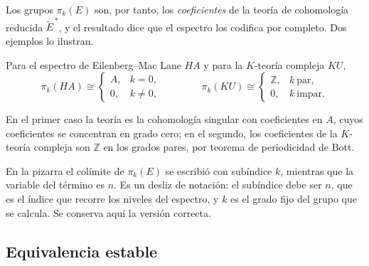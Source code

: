 Los grupos $\pi_k(E)$ son, por tanto, los \emph{coeficientes} de la teoría de cohomología reducida $\widetilde E^{\,*}$, y el resultado dice que el espectro los codifica por completo. Dos ejemplos lo ilustran.


\begin{ejem}\label{ejem:pi-ha-ku}
Para el espectro de Eilenberg--Mac Lane $HA$ y para la $K$-teoría compleja $KU$,
\[
\pi_k(HA)\cong
\begin{cases}
A, & k=0,\\
0, & k\neq0,
\end{cases}
\qquad\qquad
\pi_k(KU)\cong
\begin{cases}
\mathbb Z, & k\ \text{par},\\
0, & k\ \text{impar}.
\end{cases}
\]
\end{ejem}

En el primer caso la teoría es la cohomología singular con coeficientes en $A$, cuyos coeficientes se concentran en grado cero; en el segundo, los coeficientes de la $K$-teoría compleja son $\mathbb Z$ en los grados pares, por teorema de periodicidad de Bott.

\begin{nota}
   En la pizarra el colímite de $\pi_k(E)$ se escribió con subíndice $k$, mientras que la variable del término es $n$. Es un desliz de notación: el subíndice debe ser $n$, que es el índice que recorre los niveles del espectro, y $k$ es el grado fijo del grupo que se calcula. Se conserva aquí la versión correcta.
\end{nota}

\subsection{Equivalencia estable}

